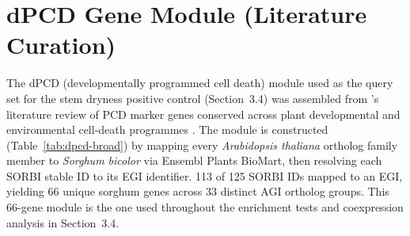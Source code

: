 
\clearpage
\section{dPCD Gene Module (Literature Curation)}
\label{sec:dpcd-module}
\hspace{1em}The dPCD (developmentally programmed cell death) module used as the query set for the stem dryness positive control (Section~3.4) was assembled from \citeauthor{olvera-carrilloConservedCorePCD2015}'s literature review of PCD marker genes conserved across plant developmental and environmental cell-death programmes \cite{olvera-carrilloConservedCorePCD2015}. The module is constructed (Table~\ref{tab:dpcd-broad}) by mapping every \textit{Arabidopsis thaliana} ortholog family member to \textit{Sorghum bicolor} via Ensembl Plants BioMart, then resolving each SORBI stable ID to its EGI identifier. 113 of 125 SORBI IDs mapped to an EGI, yielding 66 unique sorghum genes across 33 distinct AGI ortholog groups. This 66-gene module is the one used throughout the enrichment tests and coexpression analysis in Section~3.4.


